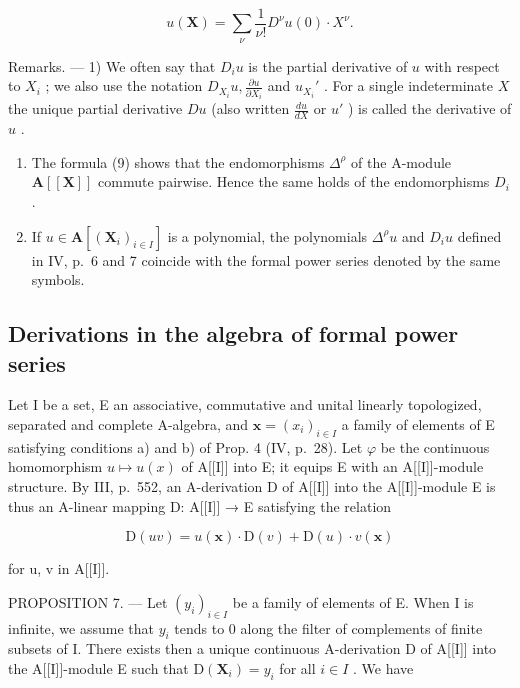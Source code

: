 \[
u (\mathbf {X}) = \sum_ {\nu} \frac {1}{\nu !} D ^ {\nu} u (0) \cdot X ^ {\nu}.\tag{14}
\]

Remarks. --- 1) We often say that \(D_i u\) is the partial derivative of \(u\) with respect to \(X_i\) ; we also use the notation \(D_{X_i} u, \frac{\partial u}{\partial X_i}\) and \(u_{X_i}'\) . For a single indeterminate \(X\) the unique partial derivative \(Du\) (also written \(\frac{du}{dX}\) or \(u'\) ) is called the derivative of \(u\) .

\begin{enumerate}
\def\labelenumi{\arabic{enumi})}
\setcounter{enumi}{1}
\item
  The formula (9) shows that the endomorphisms \(\Delta^{\rho}\) of the A-module \(\mathbf{A}[[\mathbf{X}]]\) commute pairwise. Hence the same holds of the endomorphisms \(D_i\) .
\item
  If \(u \in \mathbf{A}[(\mathbf{X}_i)_{i \in I}]\) is a polynomial, the polynomials \(\Delta^{\rho} u\) and \(D_i u\) defined in IV, p.~6 and 7 coincide with the formal power series denoted by the same symbols.
\end{enumerate}

\subsection{Derivations in the algebra of formal power series}

Let I be a set, E an associative, commutative and unital linearly topologized, separated and complete A-algebra, and \(\mathbf{x} = (x_{i})_{i \in I}\) a family of elements of E satisfying conditions a) and b) of Prop. 4 (IV, p.~28). Let \(\varphi\) be the continuous homomorphism \(u \mapsto u(x)\) of A{[}{[}I{]}{]} into E; it equips E with an A{[}{[}I{]}{]}-module structure. By III, p.~552, an A-derivation D of A{[}{[}I{]}{]} into the A{[}{[}I{]}{]}-module E is thus an A-linear mapping D: A{[}{[}I{]}{]} → E satisfying the relation

\[
\mathrm{D} (u v) = u (\mathbf {x}) \cdot \mathrm{D} (v) + \mathrm{D} (u) \cdot v (\mathbf {x})\tag{15}
\]

for u, v in A{[}{[}I{]}{]}.

PROPOSITION 7. --- Let \((y_{i})_{i\in I}\) be a family of elements of E. When I is infinite, we assume that \(y_{i}\) tends to 0 along the filter of complements of finite subsets of I. There exists then a unique continuous A-derivation D of A{[}{[}I{]}{]} into the A{[}{[}I{]}{]}-module E such that \(\mathrm{D}(\mathbf{X}_{i})=y_{i}\) for all \(i\in I\) . We have


